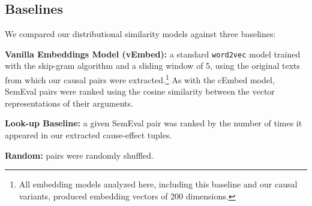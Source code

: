 \subsection{Baselines}
We compared our distributional similarity models against three baselines:

{\flushleft \textbf{Vanilla Embeddings Model (vEmbed):}} a standard \texttt{word2vec} model trained with the skip-gram algorithm and a sliding window of 5, using the original texts from which our causal pairs were extracted.\footnote{All embedding models analyzed here, including this baseline and our causal variants, produced embedding vectors of 200 dimensions.} As with the cEmbed model, SemEval pairs were ranked using the cosine similarity between the vector representations of their arguments.

{\flushleft \textbf{Look-up Baseline:}} a given SemEval pair was ranked by the number of times it appeared in our extracted cause-effect tuples. 

{\flushleft \textbf{Random:}} pairs were randomly shuffled.



